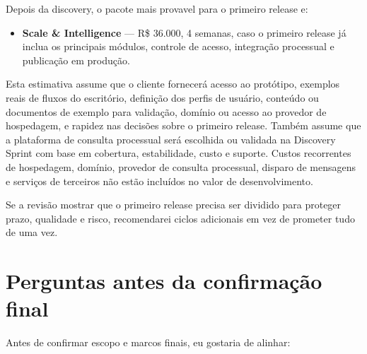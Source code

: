 \documentclass[11pt,a4paper]{article}
\begin{document}
Depois da discovery, o pacote mais provavel para o primeiro release e:\par

\begin{itemize}
\item \textbf{Scale \& Intelligence} --- R\$ 36.000, 4 semanas, caso o primeiro release já inclua os principais módulos, controle de acesso, integração processual e publicação em produção.
\end{itemize}

Esta estimativa assume que o cliente fornecerá acesso ao protótipo, exemplos reais de fluxos do escritório, definição dos perfis de usuário, conteúdo ou documentos de exemplo para validação, domínio ou acesso ao provedor de hospedagem, e rapidez nas decisões sobre o primeiro release. Também assume que a plataforma de consulta processual será escolhida ou validada na Discovery Sprint com base em cobertura, estabilidade, custo e suporte. Custos recorrentes de hospedagem, domínio, provedor de consulta processual, disparo de mensagens e serviços de terceiros não estão incluídos no valor de desenvolvimento.\par

Se a revisão mostrar que o primeiro release precisa ser dividido para proteger prazo, qualidade e risco, recomendarei ciclos adicionais em vez de prometer tudo de uma vez.\par

\section*{Perguntas antes da confirmação final}

Antes de confirmar escopo e marcos finais, eu gostaria de alinhar:\par
\end{document}
